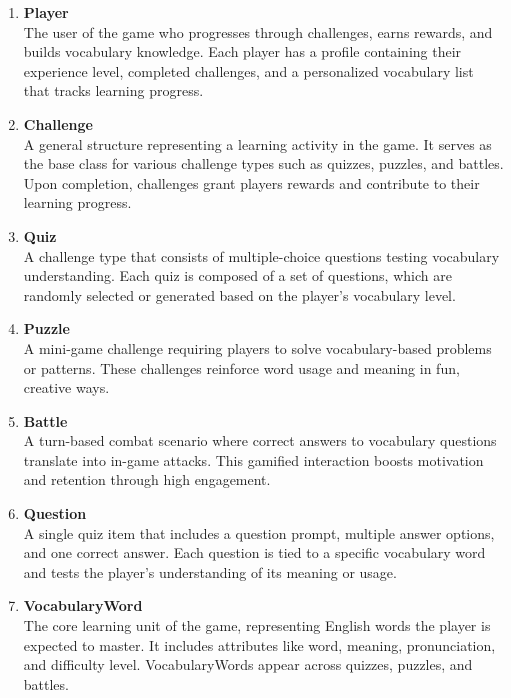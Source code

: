 \begin{enumerate}
    \item \textbf{Player}\\
    The user of the game who progresses through challenges, earns rewards, and builds vocabulary knowledge. 
    Each player has a profile containing their experience level, completed challenges, and a personalized vocabulary list that tracks learning progress.

    \item \textbf{Challenge}\\
    A general structure representing a learning activity in the game. 
    It serves as the base class for various challenge types such as quizzes, puzzles, and battles. 
    Upon completion, challenges grant players rewards and contribute to their learning progress.

    \item \textbf{Quiz}\\
    A challenge type that consists of multiple-choice questions testing vocabulary understanding. 
    Each quiz is composed of a set of questions, which are randomly selected or generated based on the player's vocabulary level.

    \item \textbf{Puzzle}\\
    A mini-game challenge requiring players to solve vocabulary-based problems or patterns. 
    These challenges reinforce word usage and meaning in fun, creative ways.

    \item \textbf{Battle}\\
    A turn-based combat scenario where correct answers to vocabulary questions translate into in-game attacks. 
    This gamified interaction boosts motivation and retention through high engagement.

    \clearpage
    
    \item \textbf{Question}\\
    A single quiz item that includes a question prompt, multiple answer options, and one correct answer. 
    Each question is tied to a specific vocabulary word and tests the player's understanding of its meaning or usage.

    \item \textbf{VocabularyWord}\\
    The core learning unit of the game, representing English words the player is expected to master. 
    It includes attributes like word, meaning, pronunciation, and difficulty level. 
    VocabularyWords appear across quizzes, puzzles, and battles.


\end{enumerate}
